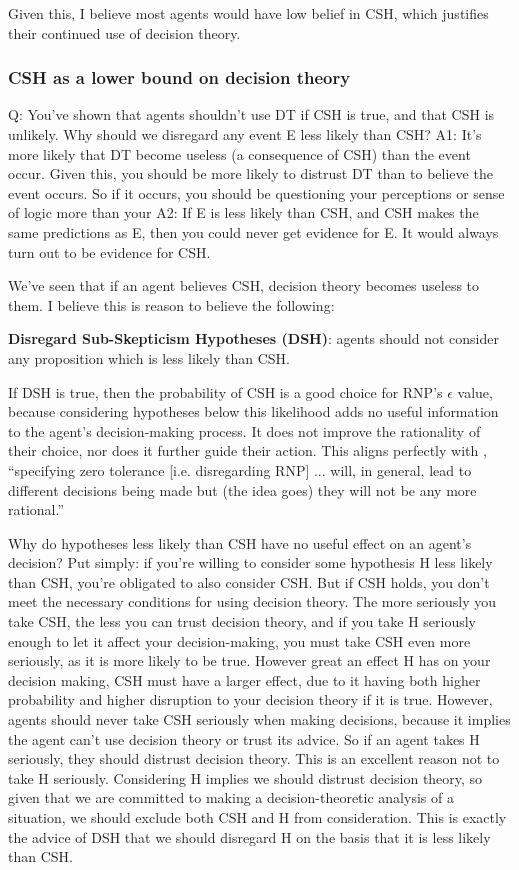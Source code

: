 \documentclass{article}
\begin{document}
Given this, I believe most agents would have low belief in CSH, which justifies their continued use of decision theory.

\subsubsection{CSH as a lower bound on decision theory}

Q: You've shown that agents shouldn't use DT if CSH is true, and that CSH is unlikely. Why should we disregard any event E less likely than CSH?
A1: It's more likely that DT become useless (a consequence of CSH) than the event occur. Given this, you should be more likely to distrust DT than to believe the event occurs. So if it occurs, you should be questioning your perceptions or sense of logic more than your 
A2: If E is less likely than CSH, and CSH makes the same predictions as E, then you could never get evidence for E. It would always turn out to be evidence for CSH.

We've seen that if an agent believes CSH, decision theory becomes useless to them. I believe this is reason to believe the following:

\textbf{Disregard Sub-Skepticism Hypotheses (DSH)}: agents should not consider any proposition which is less likely than CSH.

If DSH is true, then the probability of CSH is a good choice for RNP's \(\epsilon\) value, because considering hypotheses below this likelihood adds no useful information to the agent's decision-making process. It does not improve the rationality of their choice, nor does it further guide their action. This aligns perfectly with \citep[pg. 475]{smith2014evaluative}, ``specifying zero tolerance [i.e. disregarding RNP] ... will, in general, lead to different decisions being made \textemdash{} but (the idea goes) they will not be any more rational.''

Why do hypotheses less likely than CSH have no useful effect on an agent's decision? Put simply: if you're willing to consider some hypothesis H less likely than CSH, you're obligated to also consider CSH. But if CSH holds, you don't meet the necessary conditions for using decision theory. The more seriously you take CSH, the less you can trust decision theory, and if you take H seriously enough to let it affect your decision-making, you must take CSH even more seriously, as it is more likely to be true. However great an effect H has on your decision making, CSH must have a larger effect, due to it having both higher probability and higher disruption to your decision theory if it is true. However, agents should never take CSH seriously when making decisions, because it implies the agent can't use decision theory or trust its advice. So if an agent takes H seriously, they should distrust decision theory. This is an excellent reason not to take H seriously. Considering H implies we should distrust decision theory, so given that we are committed to making a decision-theoretic analysis of a situation, we should exclude both CSH and H from consideration. This is exactly the advice of DSH \textemdash{} that we should disregard H on the basis that it is less likely than CSH. 
\end{document}
